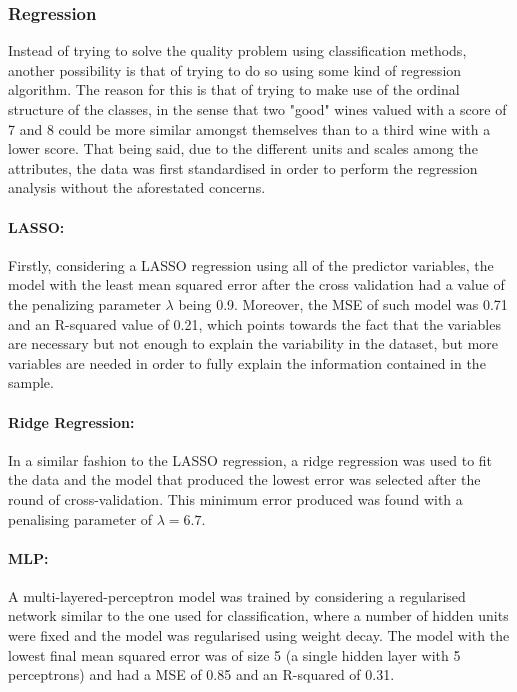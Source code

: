 \documentclass[10pt]{article}
\begin{document}
\subsubsection{Regression}

Instead of trying to solve the quality problem using classification methods, another possibility is that of trying to do so using some kind of regression algorithm. The reason for this is that of trying to make use of the ordinal structure of the classes, in the sense that two "good" wines valued with a score of 7 and 8 could be more similar amongst themselves than to a third wine with a lower score. That being said, due to the different units and scales among the attributes, the data was first standardised in order to perform the regression analysis without the aforestated concerns.

\paragraph{LASSO:}

Firstly, considering a LASSO regression using all of the predictor variables, the model with the least mean squared error after the cross validation had a value of the penalizing parameter $\lambda$ being 0.9. Moreover, the MSE of such model was 0.71 and an R-squared value of 0.21, which points towards the fact that the variables are necessary but not enough to explain the variability in the dataset, but more variables are needed in order to fully explain the information contained in the sample.

\paragraph{Ridge Regression:}

In a similar fashion to the LASSO regression, a ridge regression was used to fit the data and the model that produced the lowest error was selected after the round of cross-validation. This minimum error produced was found with a penalising parameter of $\lambda=6.7$.

\paragraph{MLP:}

A multi-layered-perceptron model was trained by considering a regularised network similar to the one used for classification, where a number of hidden units were fixed and the model was regularised using weight decay. The model with the lowest final mean squared error was of size 5 (a single hidden layer with 5 perceptrons) and had a MSE of 0.85 and an R-squared of 0.31.
\end{document}
